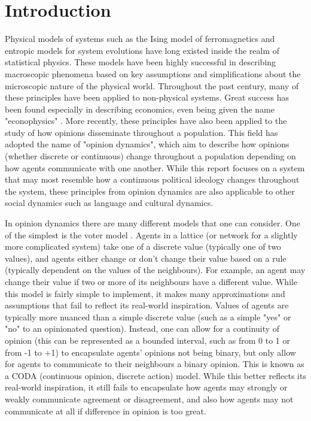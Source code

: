 \chapter{Introduction}\label{ch:introduction}

Physical models of systems such as the Ising model of ferromagnetics and entropic models for system evolutions have long existed inside the realm of statistical physics. These models have been highly successful in describing macroscopic phenomena based on key assumptions and simplifications about the microscopic nature of the physical world. Throughout the past century, many of these principles have been applied to non-physical systems. Great success has been found especially in describing economics, even being given the name "econophysics" \cite{DEAREALEAOPEREIRA2017251}. More recently, these principles have also been applied to the study of how opinions disseminate throughout a population. This field has adopted the name of "opinion dynamics", which aim to describe how opinions (whether discrete or continuous) change throughout a population depending on how agents communicate with one another. While this report focuses on a system that may most resemble how a continuous political ideology changes throughout the system, these principles from opinion dynamics are also applicable to other social dynamics such as language and cultural dynamics.

In opinion dynamics there are many different models that one can consider. One of the simplest is the voter model \cite{Choi_2025}. Agents in a lattice (or network for a slightly more complicated system) take one of a discrete value (typically one of two values), and agents either change or don't change their value based on a rule (typically dependent on the values of the neighbours). For example, an agent may change their value if two or more of its neighbours have a different value. While this model is fairly simple to implement, it makes many approximations and assumptions that fail to reflect its real-world inspiration. Values of agents are typically more nuanced than a simple discrete value (such as a simple "yes" or "no" to an opinionated question). Instead, one can allow for a continuity of opinion (this can be represented as a bounded interval, such as from 0 to 1 or from -1 to +1) to encapsulate agents' opinions not being binary, but only allow for agents to communicate to their neighbours a binary opinion. This is known as a CODA (continuous opinion, discrete action) model. While this better reflects its real-world inspiration, it still fails to encapsulate how agents may strongly or weakly communicate agreement or disagreement, and also how agents may not communicate at all if difference in opinion is too great.

